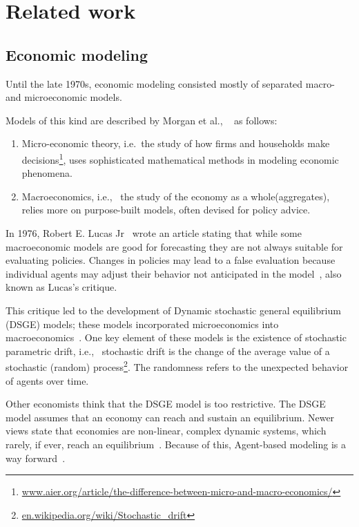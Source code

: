 \section{Related work}\label{sec:related-work}

\subsection{Economic modeling}\label{subsec:economic-modeling}
Until the late 1970s, economic modeling consisted mostly of separated macro- and microeconomic models.

Models of this kind are described by Morgan et al., ~\cite{morgan2012models}  as follows:
\begin{enumerate}
  \item Micro-economic theory, i.e.\ the study of how firms and households make decisions\footnote{\url{www.aier.org/article/the-difference-between-micro-and-macro-economics/}}, uses sophisticated mathematical methods in modeling economic phenomena.
  \item Macroeconomics, i.e., \ the study of the economy as a whole\footnotemark[\value{footnote}] (aggregates), relies more on purpose-built models, often devised for policy advice.
\end{enumerate}

In 1976, Robert E. Lucas Jr~\cite{lucas1976econometric} wrote an article stating that while some macroeconomic models are good for forecasting
they are not always suitable for evaluating policies.
Changes in policies may lead to a false evaluation because individual agents may adjust their behavior not anticipated in the model~\cite{HURTADO2014S12},
also known as Lucas's critique.

This critique led to the development of Dynamic stochastic general equilibrium (DSGE) models; these models incorporated microeconomics into macroeconomics~\cite{moos2019facts}.
One key element of these models is the existence of stochastic parametric drift, i.e., \ stochastic drift is the change of the average value of a stochastic (random) process\footnote{\url{en.wikipedia.org/wiki/Stochastic_drift}}.
The randomness refers to the unexpected behavior of agents over time.

Other economists think that the DSGE model is too restrictive.
The DSGE model assumes that an economy can reach and sustain an equilibrium.
Newer views state that economies are non-linear, complex dynamic systems, which rarely, if ever, reach an equilibrium~\cite{hamill2016agent}.
Because of this, Agent-based modeling is a way forward~\cite{hamill2016agent}.

